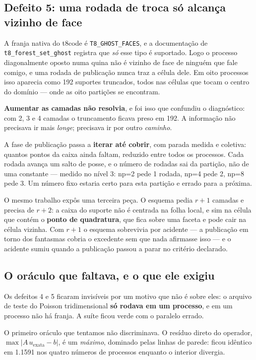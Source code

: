 \subsection{Defeito 5: uma rodada de troca só alcança vizinho de face}

A franja nativa do t8code é \texttt{T8\_GHOST\_FACES}, e a documentação de
\texttt{t8\_forest\_set\_ghost} registra que \emph{só} esse tipo é suportado.
Logo o processo diagonalmente oposto numa quina não é vizinho de face de ninguém
que fale comigo, e uma rodada de publicação nunca traz a célula dele. Em oito
processos isso aparecia como 192 suportes truncados, todos nas células que tocam
o centro do domínio --- onde as oito partições se encontram.

\textbf{Aumentar as camadas não resolvia}, e foi isso que confundiu o
diagnóstico: com 2, 3 e 4 camadas o truncamento ficava preso em 192. A informação
não precisava ir mais \emph{longe}; precisava ir por outro \emph{caminho}.

A fase de publicação passa a \textbf{iterar até cobrir}, com parada medida e
coletiva: quantos pontos da caixa ainda faltam, reduzido entre todos os
processos. Cada rodada avança um salto de posse, e o número de rodadas sai da
partição, não de uma constante --- medido no nível 3: np=2 pede 1 rodada, np=4
pede 2, np=8 pede 3. Um número fixo estaria certo para esta partição e errado
para a próxima.

O mesmo trabalho expôs uma terceira peça. O esquema pedia $r+1$ camadas e precisa
de $r+2$: a caixa do suporte não é centrada na folha local, e sim na célula que
contém o \textbf{ponto de quadratura}, que fica sobre uma faceta e pode cair na
célula vizinha. Com $r+1$ o esquema sobrevivia por acidente --- a publicação em
torno dos fantasmas cobria o excedente sem que nada afirmasse isso --- e o
acidente sumiu quando a publicação passou a parar no critério declarado.

\subsection{O oráculo que faltava, e o que ele exigiu}
\label{sec:par-oraculo}

Os defeitos 4 e 5 ficaram invisíveis por um motivo que não é sobre eles: o
arquivo de teste do Poisson tridimensional \textbf{só rodava em um processo}, e
em um processo não há franja. A suíte ficou verde com o paralelo errado.

O primeiro oráculo que tentamos não discriminava. O resíduo direto do operador,
$\max|A\,u_{\text{exata}} - b|$, é um \emph{máximo}, dominado pelas linhas de
parede: ficou idêntico em \num{1.1591} nos quatro números de processos enquanto
o interior divergia.

